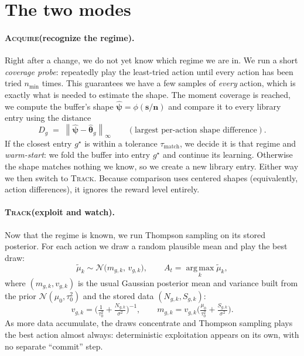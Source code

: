 \documentclass[11pt]{article}
\newcommand{\norm}[1]{\left\lVert #1 \right\rVert}
\newcommand{\argmax}{\operatorname*{arg\,max}}
\newcommand{\ACQ}{\textsc{Acquire}\xspace}
\newcommand{\TRACK}{\textsc{Track}\xspace}
\begin{document}
\section{The two modes}
\label{sec:modes}

\paragraph{\ACQ (recognize the regime).}
Right after a change, we do not yet know which regime we are in. We run a short \emph{coverage
probe}: repeatedly play the least-tried action until every action has been tried $n_{\min}$ times.
This guarantees we have a few samples of \emph{every} action, which is exactly what is needed to
estimate the shape. The moment coverage is reached, we compute the buffer's shape
$\widehat{\bm\psi}=\phi(\bm s/\bm n)$ and compare it to every library entry using the distance
\begin{equation}
    D_g \;=\; \norm{\widehat{\bm\psi} - \widehat{\bm\theta}_g}_\infty
    \qquad (\text{largest per-action shape difference}).
\end{equation}
If the closest entry $g^\star$ is within a tolerance $\tau_{\mathrm{match}}$, we decide it is that
regime and \emph{warm-start}: we fold the buffer into entry $g^\star$ and continue its learning.
Otherwise the shape matches nothing we know, so we create a new library entry. Either way we then
switch to \TRACK. Because comparison uses centered shapes (equivalently, action differences), it
ignores the reward level entirely.

\paragraph{\TRACK (exploit and watch).}
Now that the regime is known, we run Thompson sampling on its stored posterior. For each action
we draw a random plausible mean and play the best draw:
\begin{equation}
    \widetilde\mu_k \sim \mathcal N\!\big(m_{g,k},\, v_{g,k}\big),
    \qquad A_t=\argmax_k \widetilde\mu_k,
    \label{eq:ts}
\end{equation}
where $(m_{g,k},v_{g,k})$ is the usual Gaussian posterior mean and variance built from the prior
$\mathcal N(\mu_0,\tau_0^2)$ and the stored data $(N_{g,k},S_{g,k})$:
\begin{equation}
    v_{g,k}=\Big(\tfrac{1}{\tau_0^2}+\tfrac{N_{g,k}}{\sigma^2}\Big)^{-1},
    \qquad
    m_{g,k}=v_{g,k}\Big(\tfrac{\mu_0}{\tau_0^2}+\tfrac{S_{g,k}}{\sigma^2}\Big).
    \label{eq:post}
\end{equation}
As more data accumulate, the draws concentrate and Thompson sampling plays the best action almost
always: deterministic exploitation appears on its own, with no separate ``commit'' step.
\end{document}

